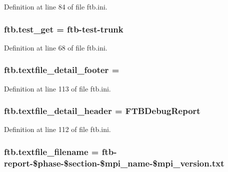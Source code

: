 Definition at line 84 of file ftb.\-ini.

\hypertarget{namespaceftb_a7e0cbd6a960d7a066181ef774535b781}{
\subsubsection[{test\-\_\-get}]{\setlength{\rightskip}{0pt plus 5cm}ftb.\-test\-\_\-get = ftb-\/test-\/trunk}}\label{namespaceftb_a7e0cbd6a960d7a066181ef774535b781}


Definition at line 68 of file ftb.\-ini.

\hypertarget{namespaceftb_a16b758d8bc177b624ed4801c0dea55c8}{
\subsubsection[{textfile\-\_\-detail\-\_\-footer}]{\setlength{\rightskip}{0pt plus 5cm}ftb.\-textfile\-\_\-detail\-\_\-footer =}}\label{namespaceftb_a16b758d8bc177b624ed4801c0dea55c8}


Definition at line 113 of file ftb.\-ini.

\hypertarget{namespaceftb_a1c9c073a1fdb526fd58eca74cc6012a2}{
\subsubsection[{textfile\-\_\-detail\-\_\-header}]{\setlength{\rightskip}{0pt plus 5cm}ftb.\-textfile\-\_\-detail\-\_\-header = F\-T\-B\-Debug\-Report}}\label{namespaceftb_a1c9c073a1fdb526fd58eca74cc6012a2}


Definition at line 112 of file ftb.\-ini.

\hypertarget{namespaceftb_aeffc0ba718912c9454faca1507b2e327}{
\subsubsection[{textfile\-\_\-filename}]{\setlength{\rightskip}{0pt plus 5cm}ftb.\-textfile\-\_\-filename = ftb-\/report-\/\$phase-\/\$section-\/\$mpi\-\_\-name-\/\$mpi\-\_\-version.\-txt}}\label{namespaceftb_aeffc0ba718912c9454faca1507b2e327}


